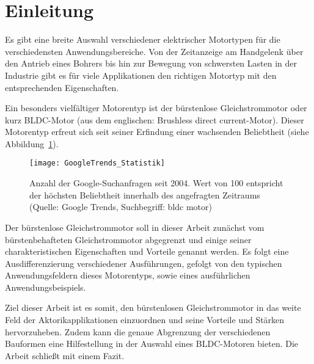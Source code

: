 \section{Einleitung}

Es gibt eine breite Auswahl verschiedener elektrischer Motortypen für die verschiedensten Anwendungsbereiche. Von der Zeitanzeige am Handgelenk über den Antrieb eines Bohrers bis hin zur Bewegung von schwersten Lasten in der Industrie gibt es für viele Applikationen den richtigen Motortyp mit den entsprechenden Eigenschaften.

Ein besonders vielfältiger Motorentyp ist der bürstenlose Gleichstrommotor oder kurz BLDC-Motor (aus dem englischen: \glqq{}Brushless direct current\grqq{}-Motor). Dieser Motorentyp erfreut sich seit seiner Erfindung einer wachsenden Beliebtheit (siehe Abbildung~\ref{fig:Statistik}).

\begin{figure}[h]
  \centering
  \texttt{[image: GoogleTrends\_Statistik]}
  \caption[Anzahl Google-Suchanfragen]{Anzahl der Google-Suchanfragen seit 2004. Wert von 100 entspricht der höchsten Beliebtheit innerhalb des angefragten Zeitraums (Quelle: Google Trends, Suchbegriff: \glqq{}bldc motor\grqq{})}
  \label{fig:Statistik}
\end{figure}

Der bürstenlose Gleichstrommotor soll in dieser Arbeit zunächst vom bürstenbehafteten Gleichstrommotor abgegrenzt und einige seiner charakteristischen Eigenschaften und Vorteile genannt werden. Es folgt eine Ausdifferenzierung verschiedener Ausführungen, gefolgt von den typischen Anwendungsfeldern dieses Motorentyps, sowie eines ausführlichen Anwendungsbeispiels.

Ziel dieser Arbeit ist es somit, den bürstenlosen Gleichstrommotor in das weite Feld der Aktorikapplikationen einzuordnen und seine Vorteile und Stärken hervorzuheben. Zudem kann die genaue Abgrenzung der verschiedenen Bauformen eine Hilfestellung in der Auswahl eines BLDC-Motoren bieten. Die Arbeit schließt mit einem Fazit.

